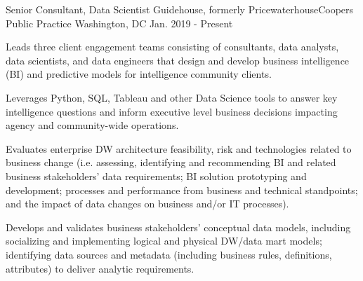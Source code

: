 

\begin{cventries}

  \cventry
    {Senior Consultant, Data Scientist} %
    {Guidehouse, formerly PricewaterhouseCoopers Public Practice} %
    {Washington, DC} %
    {Jan. 2019 - Present} %
    {
      \begin{cvitems} %
        \item {Leads three client engagement teams consisting of consultants, data analysts, data scientists, and data engineers that design and develop business intelligence (BI) and predictive models for intelligence community clients.}
        \item {Leverages Python, SQL, Tableau and other Data Science tools to answer key intelligence questions and inform executive level business decisions impacting agency and community-wide operations.}
        \item {Evaluates enterprise DW architecture feasibility, risk and technologies related to business change (i.e. assessing, identifying and recommending BI and related business stakeholders' data requirements; BI solution prototyping and development; processes and performance from business and technical standpoints; and the impact of data changes on business and/or IT processes).}
        \item {Develops and validates business stakeholders' conceptual data models, including socializing and implementing logical and physical DW/data mart models; identifying data sources and metadata (including business rules, definitions, attributes) to deliver analytic requirements.}
      \end{cvitems}
    }


\end{cventries}
